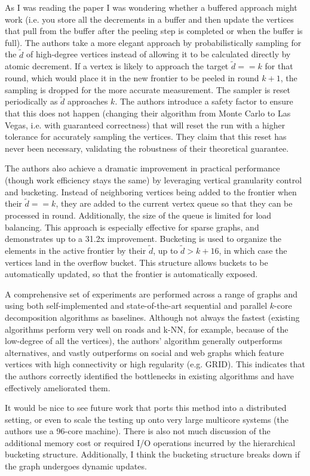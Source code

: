 As I was reading the paper I was wondering whether a buffered approach might work (i.e. you store all the decrements in a buffer and then update the vertices that pull from the buffer after the peeling step is completed or when the buffer is full). The authors take a more elegant approach by probabilistically sampling for the $\tilde{d}$ of high-degree vertices instead of allowing it to be calculated directly by atomic decrement. If a vertex is likely to approach the target $\tilde{d} == k$ for that round, which would place it in the new frontier to be peeled in round $k+1$, the sampling is dropped for the more accurate measurement. The sampler is reset periodically as $\tilde{d}$ approaches $k$. The authors introduce a safety factor to ensure that this does not happen (changing their algorithm from Monte Carlo to Las Vegas, i.e. with guaranteed correctness) that will reset the run with a higher tolerance for accurately sampling the vertices. They claim that this reset has never been necessary, validating the robustness of their theoretical guarantee.

The authors also achieve a dramatic improvement in practical performance (though work efficiency stays the same) by leveraging vertical granularity control and bucketing. Instead of neighboring vertices being added to the frontier when their $\tilde{d} == k$, they are added to the current vertex queue so that they can be processed in round. Additionally, the size of the queue is limited for load balancing. This approach is especially effective for sparse graphs, and demonstrates up to a 31.2x improvement. Bucketing is used to organize the elements in the active frontier by their $\tilde{d}$, up to $\tilde{d}>k+16$, in which case the vertices land in the overflow bucket. This structure allows buckets to be automatically updated, so that the frontier is automatically exposed.

A comprehensive set of experiments are performed across a range of graphs and using both self-implemented and state-of-the-art sequential and parallel $k$-core decomposition algorithms as baselines. Although not always the fastest (existing algorithms perform very well on roads and k-NN, for example, because of the low-degree of all the vertices), the authors' algorithm generally outperforms alternatives, and vastly outperforms on social and web graphs which feature vertices with high connectivity or high regularity (e.g. \textsc{GRID}). This indicates that the authors correctly identified the bottlenecks in existing algorithms and have effectively ameliorated them.

It would be nice to see future work that ports this method into a distributed setting, or even to scale the testing up onto very large multicore systems (the authors use a 96-core machine). There is also not much discussion of the additional memory cost or required I/O operations incurred by the hierarchical bucketing structure. Additionally, I think the bucketing structure breaks down if the graph undergoes dynamic updates. 